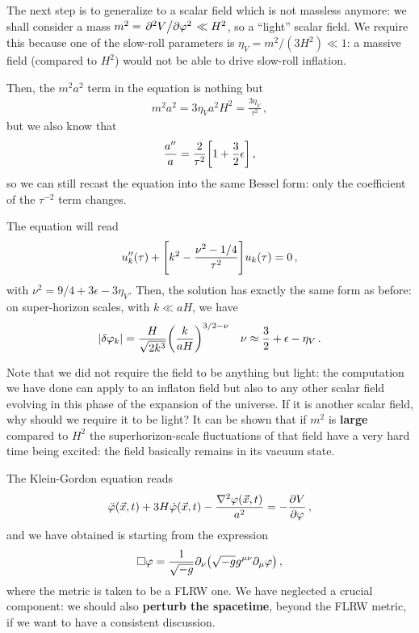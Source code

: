 \documentclass[main.tex]{subfiles}
\begin{document}
The next step is to generalize to a scalar field which is not massless anymore: we shall consider a mass \(m^2 = \pdv*[2]{V}{\varphi } \ll H^2\), so a ``light'' scalar field. 
We require this because one of the slow-roll parameters is \(\eta _V = m^2 / (3 H^2) \ll 1\): a massive field (compared to \(H^2\)) would not be able to drive slow-roll inflation. 

Then, the \(m^2 a^2\) term in the equation is nothing but 
%
\begin{align}
m^2 a^2 = 3 \eta _V a^2 H^2 = \frac{3 \eta _V}{\tau^2}
\,,
\end{align}
%
but we also know that 
%
\begin{align}
\frac{a''}{a} = \frac{2}{\tau^2 } \qty[ 1 + \frac{3}{2} \epsilon ]
\,,
\end{align}
%
so we can still recast the equation into the same Bessel form: only the coefficient of the \(\tau^{-2}\) term changes.

The equation will read 
%
\begin{align}
u''_k (\tau ) + \qty[ k^2 - \frac{\nu^2 - 1/4}{\tau^2}] u_k (\tau ) = 0
\,,
\end{align}
%
with \(\nu^2 = 9/4 + 3 \epsilon - 3 \eta _V\). 
Then, the solution has exactly the same form as before: on super-horizon scales, with \(k \ll aH\), we have
%
\begin{align}
\abs{ \delta \varphi _k} = \frac{H}{\sqrt{2 k^3}} \qty( \frac{k}{aH})^{3/2 - \nu }
&&
\nu \approx \frac{3}{2} + \epsilon - \eta _V
\,.
\end{align}

Note that we did not require the field to be anything but light: the computation we have done can apply to an inflaton field but also to any other scalar field evolving in this phase of the expansion of the universe. 
If it is another scalar field, why should we require it to be light? It can be shown that if \(m^2\) is \textbf{large} compared to \(H^2\) the superhorizon-scale fluctuations of that field have a very hard time being excited: the field basically remains in its vacuum state. 


The Klein-Gordon equation reads 
%
\begin{align}
\ddot{\varphi} (\vec{x}, t)
+ 3 H \dot{\varphi} (\vec{x}, t)
- \frac{\nabla^2 \varphi (\vec{x},t)}{a^2}
= - \pdv{V}{\varphi }
\,,
\end{align}
%
and we have obtained is starting from the expression 
%
\begin{align}
\square \varphi = \frac{1}{\sqrt{-g}} \partial_{\nu } \qty(\sqrt{-g} g^{\mu \nu } \partial_{\mu } \varphi )
\,,
\end{align}
%
where the metric is taken to be a FLRW one. We have neglected a crucial component: we should also \textbf{perturb the spacetime}, beyond the FLRW metric, if we want to have a consistent discussion. 
\end{document}
